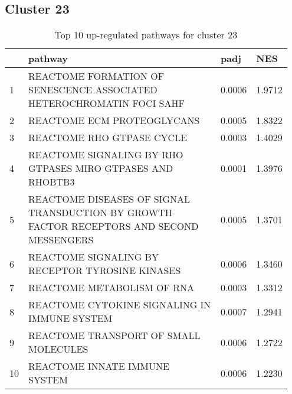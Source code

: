 \documentclass{article}
\begin{document}
\subsection{Cluster 23 }
\begin{table}[H]
\centering
\begin{tabular}{p{0.05\linewidth}p{0.7\linewidth}p{0.1\linewidth}p{0.1\linewidth}}
  \hline
 & pathway & padj & NES \\ 
  \hline
1 & REACTOME FORMATION OF SENESCENCE ASSOCIATED HETEROCHROMATIN FOCI SAHF & 0.0006 & 1.9712 \\ 
  2 & REACTOME ECM PROTEOGLYCANS & 0.0005 & 1.8322 \\ 
  3 & REACTOME RHO GTPASE CYCLE & 0.0003 & 1.4029 \\ 
  4 & REACTOME SIGNALING BY RHO GTPASES MIRO GTPASES AND RHOBTB3 & 0.0001 & 1.3976 \\ 
  5 & REACTOME DISEASES OF SIGNAL TRANSDUCTION BY GROWTH FACTOR RECEPTORS AND SECOND MESSENGERS & 0.0005 & 1.3701 \\ 
  6 & REACTOME SIGNALING BY RECEPTOR TYROSINE KINASES & 0.0006 & 1.3460 \\ 
  7 & REACTOME METABOLISM OF RNA & 0.0003 & 1.3312 \\ 
  8 & REACTOME CYTOKINE SIGNALING IN IMMUNE SYSTEM & 0.0007 & 1.2941 \\ 
  9 & REACTOME TRANSPORT OF SMALL MOLECULES & 0.0006 & 1.2722 \\ 
  10 & REACTOME INNATE IMMUNE SYSTEM & 0.0006 & 1.2230 \\ 
   \hline
\end{tabular}
\caption{Top 10 up-regulated pathways for cluster 23} 
\label{tab:q3_2_23}
\end{table}
\end{document}
